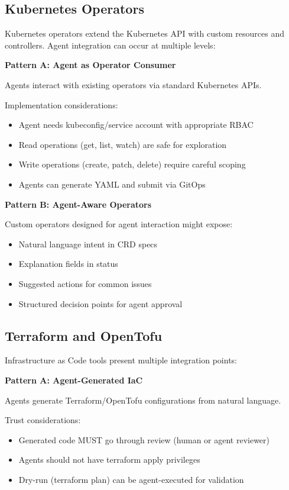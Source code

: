 \subsection{Kubernetes Operators}
\label{subsec:kubernetes-operators}

Kubernetes operators extend the Kubernetes API with custom resources and controllers. Agent integration can occur at multiple levels:

\textbf{Pattern A: Agent as Operator Consumer}

Agents interact with existing operators via standard Kubernetes APIs.

Implementation considerations:
\begin{itemize}
    \item Agent needs kubeconfig/service account with appropriate RBAC
    \item Read operations (get, list, watch) are safe for exploration
    \item Write operations (create, patch, delete) require careful scoping
    \item Agents can generate YAML and submit via GitOps
\end{itemize}

\textbf{Pattern B: Agent-Aware Operators}

Custom operators designed for agent interaction might expose:
\begin{itemize}
    \item Natural language intent in CRD specs
    \item Explanation fields in status
    \item Suggested actions for common issues
    \item Structured decision points for agent approval
\end{itemize}

\subsection{Terraform and OpenTofu}
\label{subsec:terraform}

Infrastructure as Code tools present multiple integration points:

\textbf{Pattern A: Agent-Generated IaC}

Agents generate Terraform/OpenTofu configurations from natural language.

Trust considerations:
\begin{itemize}
    \item Generated code MUST go through review (human or agent reviewer)
    \item Agents should not have terraform apply privileges
    \item Dry-run (terraform plan) can be agent-executed for validation
\end{itemize}


